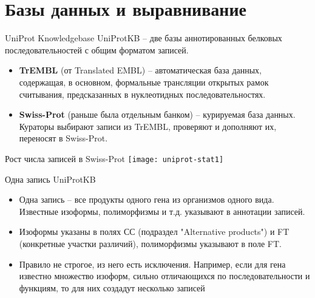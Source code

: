 \section{Базы данных  и выравнивание}

\begin{frame}{UniProt Knowledgebase}
    UniProtKB – две базы аннотированных белковых последовательностей с общим форматом
записей.
\begin{itemize}
    \item \textbf{TrEMBL} (от Translated EMBL) – автоматическая база данных, содержащая, в основном,
формальные трансляции открытых рамок считывания, предсказанных в нуклеотидных последовательностях.
    \item \textbf{Swiss-Prot} (раньше была отдельным банком) – курируемая база данных. Кураторы выбирают
записи из TrEMBL, проверяют и дополняют их, переносят в Swiss-Prot.
\end{itemize}
\end{frame}

\begin{frame}{Рост числа записей в Swiss-Prot}
    \centering
    \texttt{[image: uniprot-stat1]}
\end{frame}

\begin{frame}{Одна запись UniProtKB}
    \begin{itemize}
        \item     Одна запись – все продукты одного гена из организмов одного вида. Известные изоформы,
полиморфизмы и т.д. указывают в аннотации записей.
        \item Изоформы указаны в полях СС (подраздел "Alternative products") и FT (конкретные участки
различий), полиморфизмы указывают в поле FT.
    \item Правило не строгое, из него есть исключения. Например, если для гена известно множество
изоформ, сильно отличающихся по последовательности и функциям, то для них создадут несколько записей
    \end{itemize}
\end{frame}

